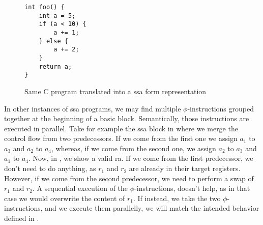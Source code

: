 \begin{figure}[ht]
\centering
\begin{minipage}{0.38\textwidth}
\lstset{style=C}
\begin{lstlisting}[caption={C program merging variables at line 8}, label={fig:ssabefore}]
int foo() {
    int a = 5;
    if (a < 10) {
        a += 1;
    } else {
        a += 2;
    }
    return a;
}
\end{lstlisting}
\end{minipage}
\hfill
\begin{minipage}{0.58\textwidth}
  \centering
  \caption{Same C program translated into a \gls{ssa} form representation}
  \label{fig:ssaafter}
\end{minipage}
\end{figure}

In other instances of \gls{ssa} programs, we may find multiple $\phi$-instructions grouped together at the beginning of a basic block. Semantically, those instructions are executed in parallel.
Take for example the \gls{ssa} block in  where we merge the control flow from two predecessors. If we come from the first one we assign $a_1$ to $a_3$ and $a_2$ to $a_4$, whereas, if we come from the second one, we assign $a_2$ to $a_3$ and $a_1$ to $a_4$. Now, in , we show a valid \gls{ra}. If we come from the first predecessor, we don't need to do anything, as $r_1$ and $r_2$ are already in their target registers.
However, if we come from the second predecessor, we need to perform a swap of $r_1$ and $r_2$. A sequential execution of the $\phi$-instructions, doesn't help, as in that case we would overwrite the content of $r_1$. If instead, we take the two $\phi$-instructions, and we execute them parallelly, we will match the intended behavior defined in .

